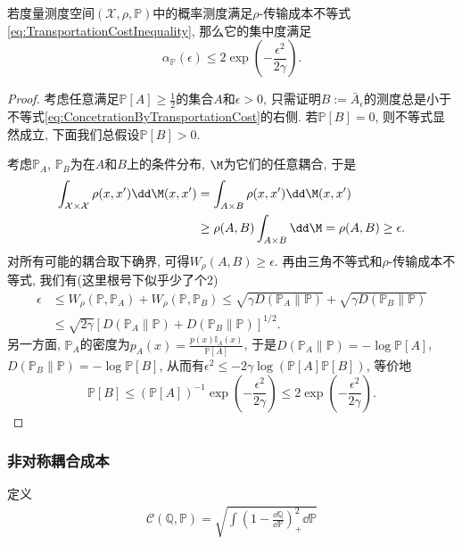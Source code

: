  
\begin{theorem}
	若度量测度空间$(\mathcal{X}, \rho, \mathbb{P})$中的概率测度满足$\rho$-传输成本不等式\eqref{eq:TransportationCostInequality}, 那么它的集中度满足
	\begin{equation}\label{eq:ConcetrationByTransportationCost}
		\alpha_{\mathbb{P}}(\epsilon) \leq 2 \exp \left(- \frac{\epsilon^2}{2 \gamma} \right).
	\end{equation}
\end{theorem}
\begin{proof}
	考虑任意满足$\mathbb{P}[A] \geq \frac12$的集合$A$和$\epsilon > 0$, 只需证明$B := \bar A_{\epsilon}$的测度总是小于不等式\eqref{eq:ConcetrationByTransportationCost}的右侧. 
	若$\mathbb{P}[B] = 0$, 则不等式显然成立, 下面我们总假设$\mathbb{P}[B] > 0$. 
	
	考虑$\mathbb{P}_A$, $\mathbb{P}_B$为在$A$和$B$上的条件分布, $\M$为它们的任意耦合, 于是
	\begin{align*}
		\int_{\mathcal{X} \times \mathcal{X}} \rho(x, x') \dd \M(x, x')
		&= \int_{A \times B} \rho(x, x') \dd \M(x, x') \\
		&\geq \rho(A, B) \int_{A \times B} \dd \M 
		= \rho(A, B) 
		\geq \epsilon. 
	\end{align*}
	对所有可能的耦合取下确界, 可得$W_{\rho}(A, B) \geq \epsilon$. 
	再由三角不等式和$\rho$-传输成本不等式, 我们有(这里根号下似乎少了个2)
	\begin{align*}
		\epsilon 
		&\leq W_{\rho}(\mathbb{P}, \mathbb{P}_A) + W_{\rho}(\mathbb{P}, \mathbb{P}_B) 
		\leq \sqrt{\gamma D(\mathbb{P}_A \| \mathbb{P})} + \sqrt{\gamma D(\mathbb{P}_B \| \mathbb{P})} \\
		&\leq \sqrt{2 \gamma} \left[ D(\mathbb{P}_A \| \mathbb{P}) + D(\mathbb{P}_B \| \mathbb{P}) \right]^{1/2}.
	\end{align*}
	另一方面, $\mathbb{P}_A$的密度为$p_A(x) = \frac{p(x) \mathbb I_A(x)}{\mathbb{P}[A]}$, 于是$D(\mathbb{P}_A \| \mathbb{P}) = - \log \mathbb{P}[A]$, $D(\mathbb{P}_B \| \mathbb{P}) = -\log \mathbb{P}[B]$, 从而有$\epsilon^2 \leq -  2 \gamma \log (\mathbb{P}[A] \mathbb{P}[B])$, 等价地
	\begin{equation*}
		 \mathbb{P}[B] 
		 \leq (\mathbb{P}[A])^{-1} \exp\left(- \frac{\epsilon^2}{2 \gamma} \right) 
		 \leq 2 \exp\left(- \frac{\epsilon^2}{2 \gamma} \right). 
	\end{equation*}
\end{proof}



\subsubsection{非对称耦合成本}

定义
\begin{align*}
	\mathcal{C}(\mathbb{Q}, \mathbb{P})
	= \sqrt{\int\left(1 - \frac{\dd \mathbb{Q}}{\dd \mathbb{P}} \right)_+^2 \dd \mathbb{P}}
\end{align*}




















